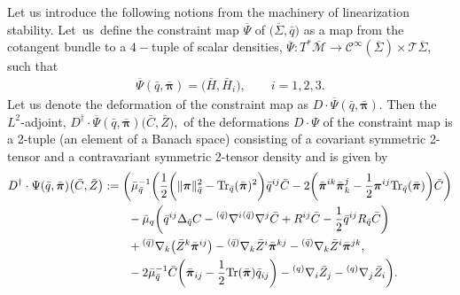\documentclass[pdftex]{sigma}
\def\mbo#1{\boldsymbol{#1}}%
\def\olin#1{\overline{#1}{}}%
\def\grad{{\nabla}}%
\newcommand{\leftexp}[2]{{\vphantom{#2}}^{#1}{#2}}
\def\halb{\frac{1}{2}}%
\numberwithin{equation}{section}
\begin{document}
Let us introduce the following notions from the machinery of linearization stability.
Let~us~define the constraint map $\olin{\Psi}$ of $\bigl(\overline{\Sigma}, \bar{q}\bigr)$ as a map from the cotangent bundle to a $4-$tuple of scalar densities, $ \olin{\Psi} \colon T^* \olin{\mathcal{M}} \to \mathcal{C}^{\infty} (\olin{\Sigma}) \times \mathcal{T} \olin{\Sigma}$, such that
\begin{align*}
\olin{\Psi} (\bar{q}, \bar{\mbo{\pi}}) = \bigl(\bar{H}, \bar{H}_i\bigr), \qquad i = 1, 2, 3.
\end{align*}
Let us denote the deformation of the constraint map as $D \cdot \olin{\Psi} (\bar{q}, \bar{\mbo{\pi}})$.
Then the $L^2$-adjoint,
$D^\dagger \cdot \olin{\Psi} (\bar{q}, \bar{\mbo{\pi}}) \bigl(\bar{C}, \bar{Z}\bigr), $ of the deformations $D \cdot \Psi$ of the constraint map is a
2-tuple (an element of a Banach space) consisting of a covariant symmetric 2-tensor and a contravariant symmetric 2-tensor density and is given by
\begin{align}
D^\dagger \cdot \Psi (\bar{q}, \bar{\mbo{\pi}}) \bigl(\bar{C}, \bar{Z}\bigr) &:= \biggl(\bar{\mu}^{-1}_{\bar{q}} \biggl( \halb \biggl(\Vert \mbo{\pi} \Vert_{\bar{q}}^2 - {\rm Tr}_{\bar{q}}(\bar{\mbo{\pi}})^2 \biggr) \bar{q}^{ij} \bar{C} - 2 \biggl(\bar{\mbo{\pi}}^{ik} \bar{\mbo{\pi}}_k^{j} - \halb \mbo{\pi}^{ij} {\rm Tr}_{\bar{q}} (\bar{\mbo{\pi}}) \biggr) \bar{C} \biggr) \notag\\
&\hphantom{:= \biggl(}{} -\bar{\mu}_q \biggl(\bar{q}^{ij} \Delta_{\bar{q}} C - \leftexp{(\bar{q})}{\grad}^{i} \leftexp{(\bar{q})}{\grad}^{j} \bar{C} + R^{ij} \bar{C} - \halb \bar{q}^{ij} R_{\bar{q}} \bar{C} \biggr) \notag\\
&\hphantom{:= \biggl(}{} + \leftexp{(\bar{q})}{\grad}_k \bigl(\bar{Z}^k \bar{\mbo{\pi}}^{ij}\bigr) - \leftexp{(\bar{q})}{\grad}_k \bar{Z}^i \bar{\mbo{\pi}}^{kj} - \leftexp{(\bar{q})}{\grad}_k \bar{Z}^i \bar{\mbo{\pi}}^{jk}, \notag\\
&\hphantom{:= \biggl(}{} -2 \bar{\mu}_{\bar{q}}^{-1} \bar{C} \biggl(\bar{\mbo{\pi}}_{ij} - \halb {\rm Tr} (\bar{\mbo{\pi}}) \bar{q}_{ij} \biggr) - \leftexp{(q)}{\grad}_i \bar{Z}_j - \leftexp{(q)}{\grad}_j \bar{Z}_i \biggr).\label{3+1adjoint}
\end{align}
\iffalse
\end{document}
